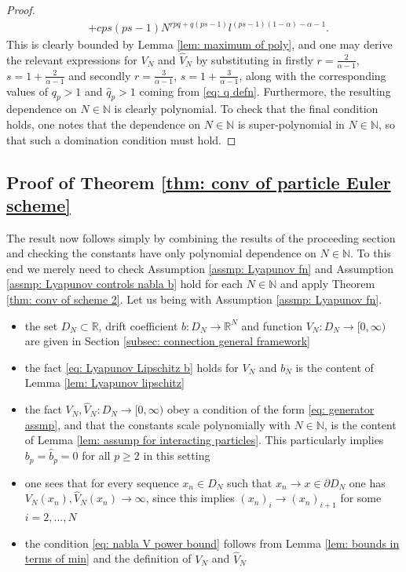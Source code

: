 \documentclass{article}
\begin{document}
\begin{proof}
\begin{align}
    &+ cps(ps-1)N^{rpq+q(ps-1)}l^{(ps-1)(1-\alpha)-\alpha-1}.
\end{align}
This is clearly bounded by Lemma \ref{lem: maximum of poly}, and one may derive the relevant expressions for $V_N$ and $\hat{V}_N$ by substituting in firstly $r=\frac{2}{\alpha-1}$, $s=1+\frac{2}{\alpha-1}$ and secondly $r=\frac{3}{\alpha-1}$, $s=1+\frac{3}{\alpha-1}$, along with the corresponding values of $q_p>1$ and $\hat{q}_p>1$ coming from \eqref{eq: q defn}. Furthermore, the resulting dependence on $N\in \mathbb{N}$ is clearly polynomial. To check that the final condition holds, one notes that the dependence on $N\in \mathbb{N}$ is super-polynomial in $N\in \mathbb{N}$, so that such a domination condition must hold.
\end{proof}

\subsection{Proof of Theorem \ref{thm: conv of particle Euler scheme}}
The result now follows simply by combining the results of the proceeding section and checking the constants have only polynomial dependence on $N\in \mathbb{N}$. To this end we merely need to check Assumption \ref{assmp: Lyapunov fn} and Assumption \ref{assmp: Lyapunov controls nabla b} hold for each $N\in \mathbb{N}$ and apply Theorem \ref{thm: conv of scheme 2}. Let us being with Assumption \ref{assmp: Lyapunov fn}. 
\begin{itemize}
    \item the set $D_N\subset \mathbb{R}$, drift coefficient $b:D_N\to\mathbb{R}^N$ and function $V_N:D_N\to [0,\infty)$ are given in Section \ref{subsec: connection general framework}
    \item the fact \eqref{eq: Lyapunov Lipschitz b} holds for $V_N$ and $b_N$ is the content of Lemma \ref{lem: Lyapunov lipschitz}
    \item the fact $V_N,\hat{V}_N:D_N\to [0,\infty)$ obey a condition of the form \eqref{eq: generator assmp}, and that the constants scale polynomially with $N\in \mathbb{N}$, is the content of Lemma \ref{lem: assump for interacting particles}. This particularly implies $b_p=\hat{b}_p=0$ for all $p\geq 2$ in this setting
    \item one sees that for every sequence $x_n\in D_N$ such that $x_n\to x\in \partial D_N$ one has $V_N(x_n),\hat{V}_N(x_n)\to \infty$, since this implies $(x_n)_i\to (x_n)_{i+1}$ for some $i=2,...,N$
    \item the condition \eqref{eq: nabla V power bound} follows from Lemma \ref{lem: bounds in terms of min} and the definition of $V_N$ and $\hat{V}_N$
\end{itemize}
\end{document}
